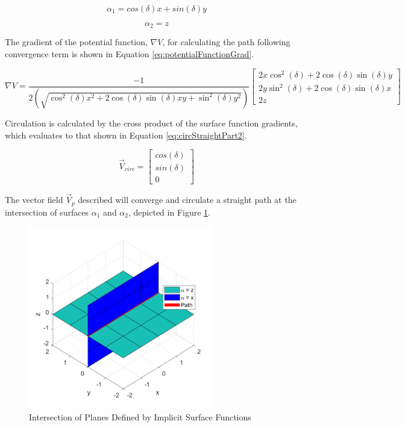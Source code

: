 \documentclass[numbered,pdftex]{ohio-etd}
\begin{document}
\begin{equation}
\label{eq:pathFunction}
\alpha_1 = cos(\delta)x + sin(\delta)y
\end{equation}

\begin{equation}
\label{eq:pathFunctionZ}
\alpha_2 = z
\end{equation}



\noindent
The gradient of the potential function, $\nabla V$, for calculating the path following convergence term is shown in Equation \ref{eq:potentialFunctionGrad}.

\begin{equation}
\label{eq:potentialFunctionGrad}
\nabla V = \frac{-1}{2(\sqrt{\cos^2(\delta) x^2+2\cos(\delta)\sin(\delta) xy +\sin^2 (\delta) y^2})} \begin{bmatrix}
2x\cos^2(\delta) + 2\cos(\delta)\sin(\delta) y \\
2y\sin^2(\delta) + 2\cos(\delta)\sin(\delta) x \\
2z
\end{bmatrix}
\end{equation}

\noindent
Circulation is calculated by the cross product of the surface function gradients, which evaluates to that shown in Equation \ref{eq:circStraightPart2}.


\begin{equation}
\label{eq:circStraightPart2}
\overrightarrow{V}_{circ} = \begin{bmatrix}
cos(\delta) \\
sin(\delta) \\
0
\end{bmatrix}
\end{equation}

The vector field $\overrightarrow{V}_p$ described will converge and circulate a straight path at the intersection of surfaces $\alpha_1$ and $\alpha_2$, depicted in Figure \ref{fig:planeIntersection}.

\begin{figure}[H]
	\centering
	\includegraphics[width=8cm]{Figures/planeIntersection}
	\caption{Intersection of Planes Defined by Implicit Surface Functions}
	\label{fig:planeIntersection}
\end{figure}
\end{document}
